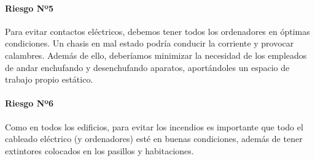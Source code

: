 \paragraph*{Riesgo Nº5}
Para evitar contactos eléctricos, debemos tener todos los ordenadores en óptimas
condiciones. Un chasis en mal estado podría conducir la corriente y provocar
calambres. Además de ello, deberíamos minimizar la necesidad de los empleados de
andar enchufando y desenchufando aparatos, aportándoles un espacio de trabajo
propio estático.
\paragraph*{Riesgo Nº6}
Como en todos los edificios, para evitar los incendios es importante que todo el
cableado eléctrico (y ordenadores) esté en buenas condiciones, además de tener
extintores colocados en los pasillos y habitaciones.

